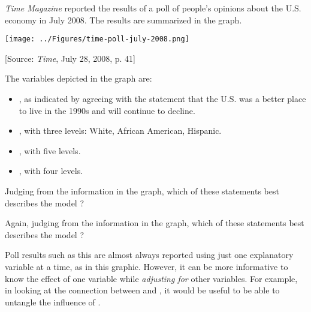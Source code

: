 
{\em Time Magazine} reported the results of a poll of people's
opinions about the U.S. economy in July 2008.  The results are summarized
in the graph.

\bigskip
\centerline{\texttt{[image: ../Figures/time-poll-july-2008.png]}}
[Source: {\em Time}, July 28, 2008, p. 41]
\bigskip

The variables depicted in the graph are:
\begin{itemize}
\item {}, as indicated by agreeing with the statement that
the U.S. was a better place to live in the 1990s and will continue to
decline.
\item {}, with three levels: White, African American, Hispanic.
\item {}, with five levels.
\item {}, with four levels.
\end{itemize}

Judging from the information in the graph, which of these statements
best describes the model ?
\begin{MultipleChoice}
\end{MultipleChoice}

Again, judging from the information in the graph, which of these
statements best describes the model ?
\begin{MultipleChoice}
\end{MultipleChoice}

Poll results such as this are almost always reported using just one
explanatory variable at a time, as in this graphic.  However, it can
be more informative to know the effect of one variable while {\em
adjusting for} other variables.  For example, in looking at the
connection between  and , it would be useful to
be able to untangle the influence of .

